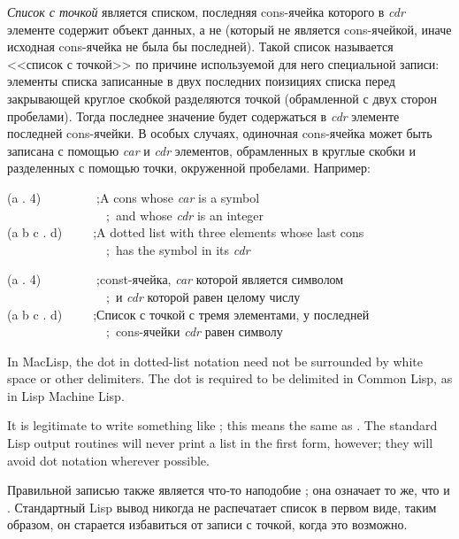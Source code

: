 {\it Список с точкой} является списком, последняя cons-ячейка которого в {\it
  cdr} элементе содержит
объект данных, а не {\nil} (который не является
cons-ячейкой, иначе исходная cons-ячейка не была бы последней).
Такой список называется <<список с точкой>> по причине используемой для него
специальной записи: элементы списка записанные в двух последних поизициях списка
перед закрывающей круглое скобкой разделяются точкой (обрамленной с двух сторон
пробелами). Тогда последнее значение будет содержаться в {\it cdr} элементе
последней cons-ячейки. В особых случаях, одиночная cons-ячейка может быть
записана с помощью {\it car} и {\it cdr} элементов, обрамленных в круглые скобки
и разделенных с помощью точки, окруженной пробелами. 
Например:
\begin{lisp}
(a . 4)~~~~~~~~~;{\rm A cons whose {\it car} is a symbol} \\
~~~~~~~~~~~~~~~~;~{\rm and whose {\it cdr} is an integer} \\
(a b c . d)~~~~~;{\rm A dotted list with three elements whose last cons} \\
~~~~~~~~~~~~~~~~;~{\rm has the symbol  in its {\it cdr}}
\end{lisp}

\begin{lisp}
(a . 4)~~~~~~~~~;{\rm const-ячейка, {\it car} которой является символом} \\
~~~~~~~~~~~~~~~~;~{\rm и {\it cdr} которой равен целому числу} \\
(a b c . d)~~~~~;{\rm Список с точкой с тремя элементами, у последней} \\
~~~~~~~~~~~~~~~~;~{\rm cons-ячейки {\it cdr} равен символу }
\end{lisp}

\beforenoterule
\begin{incompatibility}
In MacLisp, the dot in dotted-list notation
need not be surrounded by white space or other delimiters.
The dot is required to be delimited in Common Lisp, as in Lisp Machine Lisp.
\end{incompatibility}
\afternoterule

It is legitimate to write something like ;
this means the same as .  The standard Lisp
output routines will never print a list in the first form, however;
they will avoid dot notation wherever possible.

Правильной записью также является что-то наподобие ;
она означает то же, что и . Стандартный Lisp вывод никогда не
распечатает список в первом виде, таким образом, он старается избавиться от
записи с точкой, когда это возможно.

